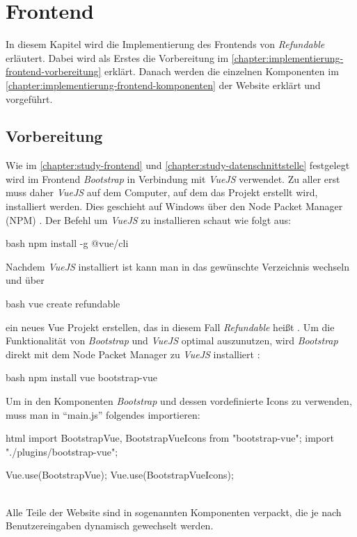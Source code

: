 \section{Frontend}
\label{chapter:implementierung-frontend}
In diesem Kapitel wird die Implementierung des Frontends von \textit{Refundable} erläutert. Dabei wird als Erstes die Vorbereitung im \autoref{chapter:implementierung-frontend-vorbereitung} erklärt. Danach werden die einzelnen Komponenten im \autoref{chapter:implementierung-frontend-komponenten} der Website erklärt und vorgeführt.
\subsection{Vorbereitung}
\label{chapter:implementierung-frontend-vorbereitung}
Wie im \autoref{chapter:study-frontend} und \autoref{chapter:study-datenschnittstelle} festgelegt wird im Frontend \textit{Bootstrap} in Verbindung mit \textit{VueJS} verwendet. Zu aller erst muss daher \textit{VueJS} auf dem Computer, auf dem das Projekt erstellt wird, installiert werden. Dies geschieht auf Windows über den Node Packet Manager (NPM) \cite{vue-install}. Der Befehl um \textit{VueJS} zu installieren schaut wie folgt aus:
\begin{code}{bash}
	npm install -g @vue/cli
\end{code}
Nachdem \textit{VueJS} installiert ist kann man in das gewünschte Verzeichnis wechseln und über
\begin{code}{bash}
	vue create refundable
\end{code}
ein neues Vue Projekt erstellen, das in diesem Fall \textit{Refundable} heißt \cite{vue-create-project}. Um die Funktionalität von \textit{Bootstrap} und \textit{VueJS} optimal auszunutzen, wird \textit{Bootstrap} direkt mit dem Node Packet Manager zu \textit{VueJS} installiert \cite{bootstrap-vue-getting-started}:
\begin{code}{bash}
	npm install vue bootstrap-vue
\end{code}
Um in den Komponenten \textit{Bootstrap} und dessen vordefinierte Icons zu verwenden, muss man in \enquote{main.js} folgendes importieren:
\begin{code}{html}
	import { BootstrapVue, BootstrapVueIcons } from "bootstrap-vue";
	import "./plugins/bootstrap-vue";
	
	Vue.use(BootstrapVue);
	Vue.use(BootstrapVueIcons);
\end{code}
	\label{list:requcommands} ~\\
Alle Teile der Website sind in sogenannten Komponenten verpackt, die je nach Benutzereingaben dynamisch gewechselt werden. 

